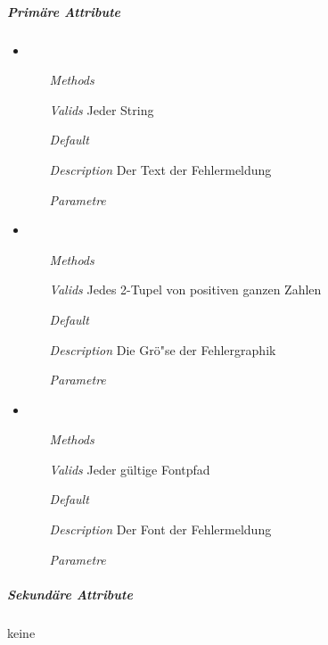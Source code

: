 
\newpage

\subparagraph{Prim\"are Attribute} 
\begin{itemize}
\item {}
\begin{enumerate}
\item[\textit{Methods}]
\item[\textit{Valids}] Jeder String
\item[\textit{Default}] 
\item[\textit{Description}] Der Text der Fehlermeldung
\item[\textit{Parametre}] 
\end{enumerate}

\item {}
\begin{enumerate}
\item[\textit{Methods}]
\item[\textit{Valids}] Jedes 2-Tupel von positiven ganzen Zahlen  
\item[\textit{Default}] 
\item[\textit{Description}] Die Gr\"o"se der Fehlergraphik
\item[\textit{Parametre}] 
\end{enumerate}

\item {}
\begin{enumerate}
\item[\textit{Methods}]
\item[\textit{Valids}] Jeder g\"ultige Fontpfad
\item[\textit{Default}] 
\item[\textit{Description}] Der Font der Fehlermeldung
\item[\textit{Parametre}] 
\end{enumerate}

\end{itemize}


\newpage

\subparagraph{Sekund\"are Attribute} 
keine

